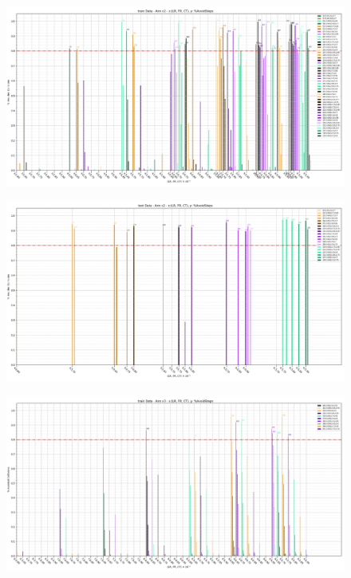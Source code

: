 
\newpage
\thispagestyle{empty}

\begin{figure}[H]
    \centering
    \includegraphics[scale=0.55,rotate=-90]{figures/train_annv2_2d.png}
    \caption{}
    \label{fig:TrainV2}
\end{figure}

\newpage
\thispagestyle{empty}

\begin{figure}[H]
    \centering
    \includegraphics[scale=0.55,rotate=-90]{figures/test_annv2_2d.png}
    \caption{}
    \label{fig:TestV2}
\end{figure}

\newpage
\thispagestyle{empty}

\begin{figure}[H]
    \centering
    \includegraphics[scale=0.55,rotate=-90]{figures/train_annv3_2d.png}
    \caption{}
    \label{fig:TrainV3}
\end{figure}

